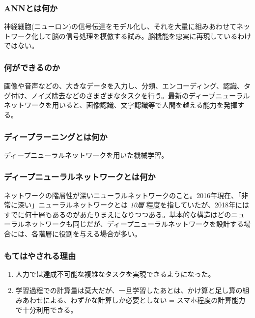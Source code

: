 \documentclass[11pt]{article}
\begin{document}
\subsubsection{ANNとは何か}\label{annux3068ux306fux4f55ux304b}

神経細胞(ニューロン)の信号伝達をモデル化し、それを大量に組みあわせてネットワーク化して脳の信号処理を模倣する試み。脳機能を忠実に再現しているわけではない。

\subsubsection{何ができるのか}\label{ux4f55ux304cux3067ux304dux308bux306eux304b}

画像や音声などの、大きなデータを入力し、分類、エンコーディング、認識、タグ付け、ノイズ除去などのさまざまなタスクを行う。最新のディープニューラルネットワークを用いると、画像認識、文字認識等で人間を越える能力を発揮する。

\subsubsection{ディープラーニングとは何か}\label{ux30c7ux30a3ux30fcux30d7ux30e9ux30fcux30cbux30f3ux30b0ux3068ux306fux4f55ux304b}

ディープニューラルネットワークを用いた機械学習。

\subsubsection{ディープニューラルネットワークとは何か}\label{ux30c7ux30a3ux30fcux30d7ux30cbux30e5ux30fcux30e9ux30ebux30cdux30c3ux30c8ux30efux30fcux30afux3068ux306fux4f55ux304b}

ネットワークの階層性が深いニューラルネットワークのこと。2016年現在、「非常に深い」ニューラルネットワークとは
\emph{10層}
程度を指していたが、2018年にはすでに何十層もあるのがあたりまえになりつつある。基本的な構造はどのニューラルネットワークも同じだが、ディープニューラルネットワークを設計する場合には、各階層に役割を与える場合が多い。

\subsubsection{もてはやされる理由}\label{ux3082ux3066ux306fux3084ux3055ux308cux308bux7406ux7531}

\begin{enumerate}
\def\labelenumi{\arabic{enumi}.}
\item
  人力では達成不可能な複雑なタスクを実現できるようになった。
\item
  学習過程での計算量は莫大だが、一旦学習したあとは、かけ算と足し算の組みあわせによる、わずかな計算しか必要としない
  = スマホ程度の計算能力で十分利用できる。
\end{enumerate}
\end{document}
